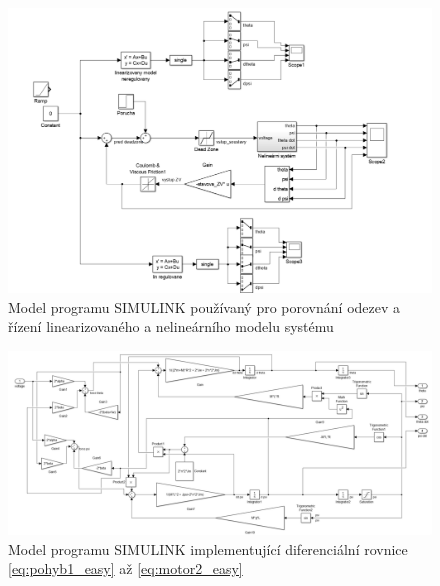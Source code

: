\documentclass[conference]{IEEEtran}
\begin{document}
\begin{figure}[htbp]
    \centerline{\includegraphics[width=\linewidth]{simulace_simulink.png}}
    \caption{Model programu SIMULINK používaný pro porovnání odezev a řízení linearizovaného a nelineárního modelu systému}
    \label{fig:simulink_simulace}        
\end{figure}

\begin{figure}[htbp]
    \centerline{\includegraphics[width=\linewidth]{nelinearni_system_simulink.png}}
    \caption{Model programu SIMULINK implementující diferenciální rovnice \eqref{eq:pohyb1_easy} až \eqref{eq:motor2_easy}}
    \label{fig:simulink_nelin_model}        
\end{figure}
\end{document}
